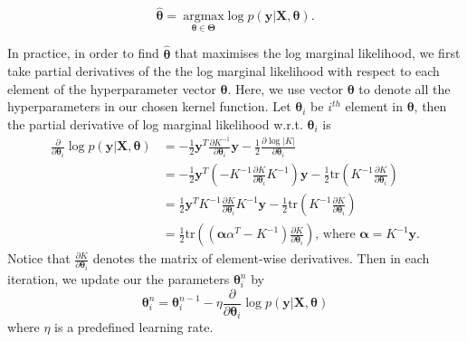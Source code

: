 \documentclass[11pt,a4paper]{article}
\theoremstyle{definition}
\numberwithin{equation}{section}
\let\vec\mathbf
\begin{document}
	\begin{equation}
	\vec{\hat \theta} = \ \underset{\vec \theta \in \vec \Theta}{\mathrm{argmax}}\log p(\vec y|\vec X, \vec \theta).
	\end{equation}
	
	In practice, in order to find $\vec{\hat \theta}$ that maximises the log marginal likelihood, we first take partial derivatives of the the log marginal likelihood with respect to each element of the hyperparameter vector $\vec \theta$. Here, we use vector $\vec \theta$ to denote all the hyperparameters in our chosen kernel function.  Let $\vec \theta_i$ be $i^{th}$ element in $\vec \theta$, then the partial derivative of log marginal likelihood w.r.t. $\vec \theta_i$ is 
	\begin{equation}
	\begin{split}
	\frac{\partial}{\partial \vec \theta_i}\log p(\vec y|\vec X, \vec \theta) & = -\frac{1}{2}\vec y^T \frac{\partial K^{-1}}{\partial \vec \theta_i}\vec y-\frac{1}{2}\frac{\partial \log|K|}{\partial \vec \theta_i}\\
	& = -\frac{1}{2}\vec y^T\left(  -K^{-1} \frac{\partial K}{\partial \vec \theta_i} K^{-1} \right)\vec y - \frac{1}{2}\text{tr} \left(K^{-1}\frac{\partial K}{\partial\vec \theta_i}\right)\\
	&= \frac{1}{2}\vec y^TK^{-1} \frac{\partial K}{\partial \vec \theta_i} K^{-1} \vec y - \frac{1}{2}\text{tr} \left(K^{-1}\frac{\partial K}{\partial\vec \theta_i}\right)\\
	& = \frac{1}{2}\text{tr} \left( (\vec \alpha\alpha^T - K^{-1})\frac{\partial K}{\partial\vec \theta_i}\right) \text{, where } \vec \alpha = K^{-1} \vec y.
	\end{split}
	\end{equation}
	Notice that $\frac{\partial K}{\partial\vec \theta_i}$ denotes the matrix of element-wise derivatives. Then in each iteration, we update our the parameters $\vec\theta^n_i$ by
	\begin{equation}
	\vec\theta^n_i = \vec\theta^{n-1}_i - \eta\frac{\partial}{\partial \vec \theta_i}\log p(\vec y|\vec X, \vec \theta) 
	\end{equation}
	where $\eta$ is a predefined learning rate. 
	
\end{document}
